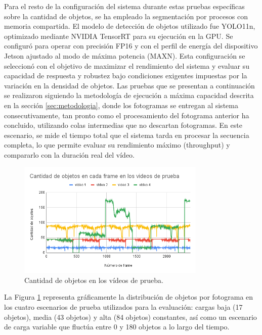 \documentclass[11pt,spanish,listoffigures,listoftables]{tfgetsinf}
\begin{document}
Para el resto de la configuración del sistema durante estas pruebas específicas sobre la cantidad de objetos, se ha empleado la segmentación por procesos con memoria compartida. El modelo de detección de objetos utilizado fue YOLO11n, optimizado mediante NVIDIA TensorRT para su ejecución en la GPU. Se configuró para operar con precisión FP16 y con el perfil de energía del dispositivo Jetson ajustado al modo de máxima potencia (MAXN). Esta configuración se seleccionó con el objetivo de maximizar el rendimiento del sistema y evaluar su capacidad de respuesta y robustez bajo condiciones exigentes impuestas por la variación en la densidad de objetos. Las pruebas que se presentan a continuación se realizaron siguiendo la metodología de ejecución a máxima capacidad descrita en la sección \ref{sec:metodologia}, donde los fotogramas se entregan al sistema consecutivamente, tan pronto como el procesamiento del fotograma anterior ha concluido, utilizando colas intermedias que no descartan fotogramas. En este escenario, se mide el tiempo total que el sistema tarda en procesar la secuencia completa, lo que permite evaluar su rendimiento máximo (throughput) y compararlo con la duración real del vídeo.

\begin{figure}[H]
   \centering
   \includegraphics[width=0.8\textwidth]{images/analisis_de_la_solucion/cantidad_objetos/cantidad_objetos_4_videos.png}
   \caption{Cantidad de objetos en los vídeos de prueba.}
   \label{fig:4_videos}
\end{figure}

La Figura \ref{fig:4_videos} representa gráficamente la distribución de objetos por fotograma en los cuatro escenarios de prueba utilizados para la evaluación: cargas baja (17 objetos), media (43 objetos) y alta (84 objetos) constantes, así como un escenario de carga variable que fluctúa entre 0 y 180 objetos a lo largo del tiempo.
\end{document}
